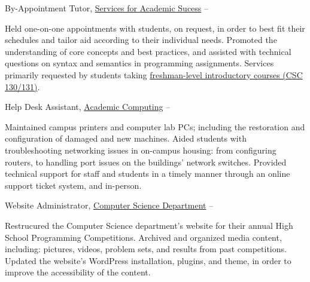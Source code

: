 \documentclass[letterpaper,MMMyyyy,nonstopmode]{simpleresumecv}
\begin{document}
\begin{Body}
\Gap

\Entry
By-Appointment Tutor,
\href{https://www.rocky.edu/student-life/student-support/academic-support/ServicesAcademicSuccess.php}
{Services for Academic Sucess}
\hfill
{} --
\begin{Detail}
\BulletItem
Held one-on-one appointments with students, on request, in order to best fit their schedules and tailor aid according to their individual needs.
\BulletItem
Promoted the understanding of core concepts and best practices, and assisted with technical questions on syntax and semantics in programming assignments.
\BulletItem
Services primarily requested by students taking \href{https://www.rocky.edu/academics/catalog/program/9/Computer_Science#courses-content}{freshman-level introductory courses (CSC 130/131)}.
\end{Detail}

\Gap

\Entry
Help Desk Assistant,
\href{https://rocky.edu/student-life/student-support/academic-computing/}
{Academic Computing}
\hfill
{} --
\begin{Detail}
\BulletItem
Maintained campus printers and computer lab PCs; including the restoration and configuration of damaged and new machines.
\BulletItem
Aided students with troubleshooting networking issues in on-campus housing: from configuring routers, to handling port issues on the buildings' network switches.
\BulletItem
Provided technical support for staff and students in a timely manner through an online support ticket system, and in-person.
\end{Detail}

\Gap

\Entry
Website Administrator,
\href{http://cs.rocky.edu/programming-competitions/high-school-competions/}
{Computer Science Department}
\hfill
{} --
\begin{Detail}
\BulletItem
Restrucured the Computer Science department's website for their annual High School Programming Competitions.
\BulletItem
Archived and organized media content, including: pictures, videos, problem sets, and results from past competitions.
\BulletItem
Updated the website's WordPress installation, plugins, and theme, in order to improve the accessibility of the content.
\end{Detail}



\end{Body}
\end{document}
